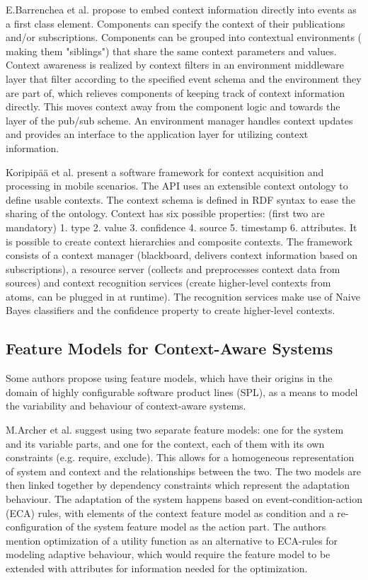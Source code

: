 E.Barrenchea et al. propose to embed context information directly into events as a first class element. Components can specify the context of their publications and/or subscriptions. Components can be grouped into contextual environments ( making them "siblings") that share the same context parameters and values. Context awareness is realized by context filters in an environment middleware layer that filter according to the specified event schema and the environment they are part of, which relieves components of keeping track of context information directly. This moves context away from the component logic and towards the layer of the pub/sub scheme.  An environment manager handles context updates and provides an interface to the application layer for utilizing  context information.

Koripip\"a\"a et al. present a software framework for context acquisition and processing in mobile scenarios. The API uses an extensible context ontology to define usable contexts. The context schema is defined in RDF syntax to ease the sharing of the ontology. Context has six possible properties: (first two are mandatory) 1. type 2. value 3. confidence 4. source 5. timestamp 6. attributes. It is possible to create context hierarchies and composite contexts.
The framework consists of a context manager (blackboard, delivers context information based on subscriptions), a resource server (collects and preprocesses context data from sources) and context recognition services (create higher-level contexts from atoms, can be plugged in at runtime). The recognition services make use of Naive Bayes classifiers and the confidence property to create higher-level contexts.

\subsection{Feature Models for Context-Aware Systems}
Some authors propose using feature models, which have their origins in the domain of highly configurable software product lines (SPL), as a means to model the variability and behaviour of context-aware systems.

M.Archer et al. suggest using two separate feature models: one for the system and its variable parts, and one for the context, each of them with its own constraints (e.g. require, exclude). This allows for a homogeneous representation of system and context and the relationships between the two. The two models are then linked together by dependency constraints which represent the adaptation behaviour. The adaptation of the system happens based on event-condition-action (ECA) rules, with elements of the context feature model as condition and a re-configuration of the system feature model as the action part. The authors mention optimization of a utility function as an alternative to ECA-rules for modeling adaptive behaviour, which would require the feature model to be extended with attributes for information needed for the optimization.

